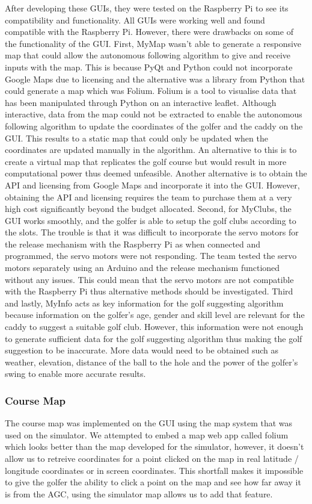 \documentclass[11pt,landscape]{article}
\begin{document}
\begin{multicols}{3}
After developing these GUIs, they were tested on the Raspberry Pi to see its
compatibility and functionality. All GUIs were working well and found compatible
with the Raspberry Pi. However, there were drawbacks on some of the
functionality of the GUI. First, MyMap wasn’t able to generate a responsive map
that could allow the autonomous following algorithm to give and receive inputs
with the map. This is because PyQt and Python could not incorporate Google Maps
due to licensing and the alternative was a library from Python that could
generate a map which was Folium. Folium is a tool to visualise data that has
been manipulated through Python on an interactive leaflet. Although interactive,
data from the map could not be extracted to enable the autonomous following
algorithm to update the coordinates of the golfer and the caddy on the GUI. This
results to a static map that could only be updated when the coordinates are
updated manually in the algorithm. An alternative to this is to create a virtual
map that replicates the golf course but would result in more computational power
thus deemed unfeasible. Another alternative is to obtain the API and licensing
from Google Maps and incorporate it into the GUI. However, obtaining the API and
licensing requires the team to purchase them at a very high cost significantly
beyond the budget allocated. Second, for MyClubs, the GUI works smoothly, and
the golfer is able to setup the golf clubs according to the slots. The trouble
is that it was difficult to incorporate the servo motors for the release
mechanism with the Raspberry Pi as when connected and programmed, the servo
motors were not responding. The team tested the servo motors separately using an
Arduino and the release mechanism functioned without any issues. This could mean
that the servo motors are not compatible with the Raspberry Pi thus alternative
methods should be investigated. Third and lastly, MyInfo acts as key information
for the golf suggesting algorithm because information on the golfer’s age,
gender and skill level are relevant for the caddy to suggest a suitable golf
club. However, this information were not enough to generate sufficient data for
the golf suggesting algorithm thus making the golf suggestion to be inaccurate.
More data would need to be obtained such as weather, elevation, distance of the
ball to the hole and the power of the golfer’s swing to enable more accurate
results. 

\subsubsection{Course Map}
The course map was implemented on the GUI using the map system that was used on
the simulator. We attempted to embed a map web app called folium which looks
better than the map developed for the simulator, however, it doesn't allow us to
retreive coordinates for a point clicked on the map in real latitude / longitude
coordinates or in screen coordinates. This shortfall makes it impossible to give
the golfer the ability to click a point on the map and see how far away it is
from the AGC, using the simulator map allows us to add that feature.


\end{multicols}
\end{document}
